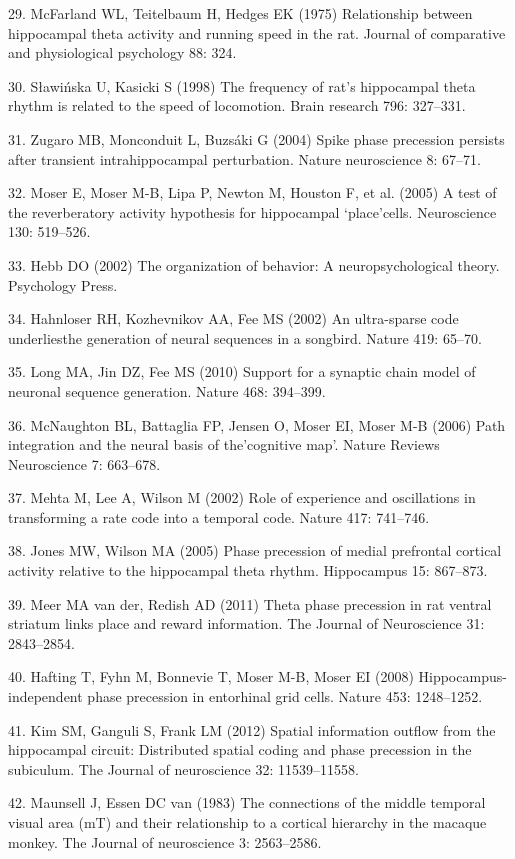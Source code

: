 \documentclass[]{article}
\begin{document}
29. McFarland WL, Teitelbaum H, Hedges EK (1975) Relationship between
hippocampal theta activity and running speed in the rat. Journal of
comparative and physiological psychology 88: 324.

30. S{ł}awi{ń}ska U, Kasicki S (1998) The frequency of rat's hippocampal
theta rhythm is related to the speed of locomotion. Brain research 796:
327--331.

31. Zugaro MB, Monconduit L, Buzs{á}ki G (2004) Spike phase precession
persists after transient intrahippocampal perturbation. Nature
neuroscience 8: 67--71.

32. Moser E, Moser M-B, Lipa P, Newton M, Houston F, et al. (2005) A
test of the reverberatory activity hypothesis for hippocampal
`place'cells. Neuroscience 130: 519--526.

33. Hebb DO (2002) The organization of behavior: A neuropsychological
theory. Psychology Press.

34. Hahnloser RH, Kozhevnikov AA, Fee MS (2002) An ultra-sparse code
underliesthe generation of neural sequences in a songbird. Nature 419:
65--70.

35. Long MA, Jin DZ, Fee MS (2010) Support for a synaptic chain model of
neuronal sequence generation. Nature 468: 394--399.

36. McNaughton BL, Battaglia FP, Jensen O, Moser EI, Moser M-B (2006)
Path integration and the neural basis of the'cognitive map'. Nature
Reviews Neuroscience 7: 663--678.

37. Mehta M, Lee A, Wilson M (2002) Role of experience and oscillations
in transforming a rate code into a temporal code. Nature 417: 741--746.

38. Jones MW, Wilson MA (2005) Phase precession of medial prefrontal
cortical activity relative to the hippocampal theta rhythm. Hippocampus
15: 867--873.

39. Meer MA van der, Redish AD (2011) Theta phase precession in rat
ventral striatum links place and reward information. The Journal of
Neuroscience 31: 2843--2854.

40. Hafting T, Fyhn M, Bonnevie T, Moser M-B, Moser EI (2008)
Hippocampus-independent phase precession in entorhinal grid cells.
Nature 453: 1248--1252.

41. Kim SM, Ganguli S, Frank LM (2012) Spatial information outflow from
the hippocampal circuit: Distributed spatial coding and phase precession
in the subiculum. The Journal of neuroscience 32: 11539--11558.

42. Maunsell J, Essen DC van (1983) The connections of the middle
temporal visual area (mT) and their relationship to a cortical hierarchy
in the macaque monkey. The Journal of neuroscience 3: 2563--2586.
\end{document}
